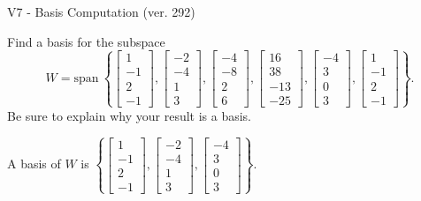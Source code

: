 \begin{exercise}
  \begin{exerciseTitle}V7 - Basis Computation (ver. 292)\end{exerciseTitle}
  \begin{exerciseStatement}
    Find a basis for the subspace 
\[W=\mathrm{span}\ \left\{\left[\begin{array}{r}
1 \\
-1 \\
2 \\
-1
\end{array}\right] , \left[\begin{array}{r}
-2 \\
-4 \\
1 \\
3
\end{array}\right] , \left[\begin{array}{r}
-4 \\
-8 \\
2 \\
6
\end{array}\right] , \left[\begin{array}{r}
16 \\
38 \\
-13 \\
-25
\end{array}\right] , \left[\begin{array}{r}
-4 \\
3 \\
0 \\
3
\end{array}\right] , \left[\begin{array}{r}
1 \\
-1 \\
2 \\
-1
\end{array}\right]\right\}.\]
 Be sure to explain why your result is a basis.


  \end{exerciseStatement}
  \begin{exerciseAnswer}
   A basis of \(W\) is  \(\left\{\left[\begin{array}{r}
1 \\
-1 \\
2 \\
-1
\end{array}\right] , \left[\begin{array}{r}
-2 \\
-4 \\
1 \\
3
\end{array}\right] , \left[\begin{array}{r}
-4 \\
3 \\
0 \\
3
\end{array}\right]\right\}\).
  


  \end{exerciseAnswer}
\end{exercise}